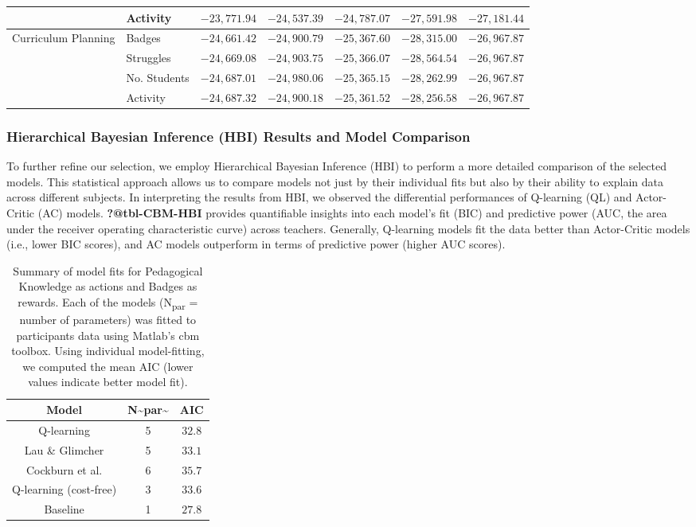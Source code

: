 \documentclass[
  number,
  preprint,
  3p,
  onecolumn]{elsarticle}
\begin{document}
\begin{longtable}{l|lrrrrr}
 & Activity & $-23,771.94$ & $-24,537.39$ & $-24,787.07$ & $-27,591.98$ & $-27,181.44$ \\ 
\midrule\addlinespace[2.5pt]
Curriculum Planning & Badges & $-24,661.42$ & $-24,900.79$ & $-25,367.60$ & $-28,315.00$ & $-26,967.87$ \\ 
 & Struggles & $-24,669.08$ & $-24,903.75$ & $-25,366.07$ & $-28,564.54$ & $-26,967.87$ \\ 
 & No. Students & $-24,687.01$ & $-24,980.06$ & $-25,365.15$ & $-28,262.99$ & $-26,967.87$ \\ 
 & Activity & $-24,687.32$ & $-24,900.18$ & $-25,361.52$ & $-28,256.58$ & $-26,967.87$ \\ 
\bottomrule

\end{longtable}

\subsubsection{Hierarchical Bayesian Inference (HBI) Results and Model
Comparison}\label{hierarchical-bayesian-inference-hbi-results-and-model-comparison}

To further refine our selection, we employ Hierarchical Bayesian
Inference (HBI) to perform a more detailed comparison of the selected
models. This statistical approach allows us to compare models not just
by their individual fits but also by their ability to explain data
across different subjects. In interpreting the results from HBI, we
observed the differential performances of Q-learning (QL) and
Actor-Critic (AC) models. \textbf{?@tbl-CBM-HBI} provides quantifiable
insights into each model's fit (BIC) and predictive power (AUC, the area
under the receiver operating characteristic curve) across teachers.
Generally, Q-learning models fit the data better than Actor-Critic
models (i.e., lower BIC scores), and AC models outperform in terms of
predictive power (higher AUC scores).

\begin{longtable}{ccc}

\caption{\label{tbl-model-summary}Summary of model fits for Pedagogical
Knowledge as actions and Badges as rewards. Each of the models
(N\textsubscript{par} = number of parameters) was fitted to participants
data using Matlab's cbm toolbox. Using individual model-fitting, we
computed the mean AIC (lower values indicate better model fit).}

\tabularnewline

\toprule
Model & N\textasciitilde{}par\textasciitilde{} & AIC \\ 
\midrule\addlinespace[2.5pt]
Q-learning & 5 & $32.8$ \\ 
Lau \& Glimcher & 5 & $33.1$ \\ 
Cockburn et al. & 6 & $35.7$ \\ 
Q-learning (cost-free) & 3 & $33.6$ \\ 
Baseline & 1 & $27.8$ \\ 
\bottomrule

\end{longtable}
\end{document}
